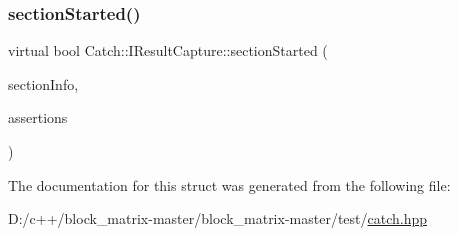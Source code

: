 \mbox{\label{struct_catch_1_1_i_result_capture_a5b76ed52badcb64cf374202e12b81a03}} 
\subsubsection{\texorpdfstring{section\+Started()}{sectionStarted()}}
{\footnotesize\ttfamily virtual bool Catch\+::\+I\+Result\+Capture\+::section\+Started (\begin{DoxyParamCaption}\item[{\mbox{\hyperlink{struct_catch_1_1_section_info}{Section\+Info}} const \&}]{section\+Info,  }\item[{\mbox{\hyperlink{struct_catch_1_1_counts}{Counts}} \&}]{assertions }\end{DoxyParamCaption})\hspace{0.3cm}{\ttfamily [pure virtual]}}



The documentation for this struct was generated from the following file\+:\begin{DoxyCompactItemize}
\item 
D\+:/c++/block\+\_\+matrix-\/master/block\+\_\+matrix-\/master/test/\mbox{\hyperlink{catch_8hpp}{catch.\+hpp}}\end{DoxyCompactItemize}
